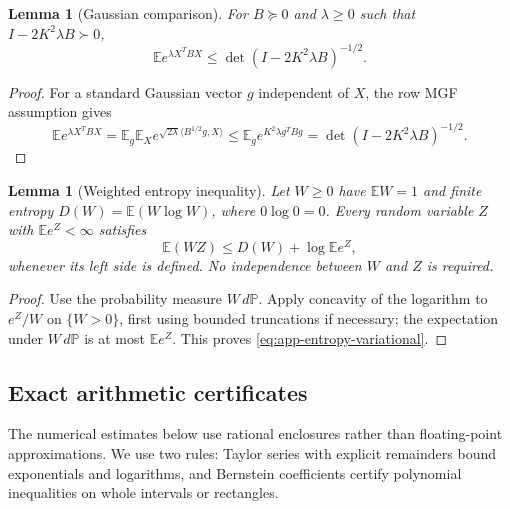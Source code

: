 \documentclass[11pt,a4paper]{article}
\newcommand{\E}{\mathbb E}
\newcommand{\PP}{\mathbb P}
\numberwithin{equation}{section}
\newtheorem{lemma}[theorem]{Lemma}
\begin{document}
\begin{lemma}[Gaussian comparison]\label{app:gaussian-comparison}
For $B\succeq0$ and $\lambda\ge0$ such that $I-2K^2\lambda B\succ0$,
\[
 \E e^{\lambda X^TBX}\le\det(I-2K^2\lambda B)^{-1/2}.
\]
\end{lemma}

\begin{proof}
For a standard Gaussian vector $g$ independent of $X$, the row MGF
assumption gives
\[
 \E e^{\lambda X^TBX}
 =\E_g\E_X e^{\sqrt{2\lambda}\langle B^{1/2}g,X\rangle}
 \le\E_g e^{K^2\lambda g^TBg}
 =\det(I-2K^2\lambda B)^{-1/2}.
\]
\end{proof}

\begin{lemma}[Weighted entropy inequality]\label{app:weighted-entropy}
Let $W\ge0$ have $\E W=1$ and finite entropy
$D(W)=\E(W\log W)$, where $0\log0=0$.
Every random variable $Z$ with $\E e^Z<\infty$ satisfies
\begin{equation}\label{eq:app-entropy-variational}
 \E(WZ)\le D(W)+\log\E e^Z,
\end{equation}
whenever its left side is defined.
No independence between $W$ and $Z$ is required.
\end{lemma}

\begin{proof}
Use the probability measure $W\,d\PP$. Apply concavity of the
logarithm to $e^Z/W$ on $\{W>0\}$, first using bounded truncations
if necessary;
the expectation under $W\,d\PP$ is at most $\E e^Z$.
This proves \eqref{eq:app-entropy-variational}.
\end{proof}


\subsection{Exact arithmetic certificates}
\label{app:arithmetic}

The numerical estimates below use rational enclosures rather than
floating-point approximations. We use two rules: Taylor series with explicit
remainders bound exponentials and logarithms, and Bernstein coefficients
certify polynomial inequalities on whole intervals or rectangles.
\end{document}
